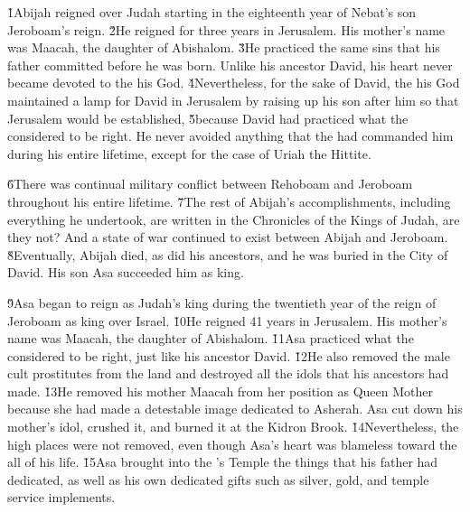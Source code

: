 \v{1}Abijah reigned over Judah starting in the eighteenth year of Nebat's son Jeroboam's reign. \v{2}He reigned for three years in Jerusalem. His mother's name was Maacah, the daughter of Abishalom. \v{3}He practiced the same sins that his father committed before he was born. Unlike his ancestor David, his heart never became devoted to the  his God. \v{4}Nevertheless, for the sake of David, the  his God maintained a lamp for David in Jerusalem by raising up his son after him so that Jerusalem would be established, \v{5}because David had practiced what the  considered to be right. He never avoided anything that the  had commanded him during his entire lifetime, except for the case of Uriah the Hittite.

\v{6}There was continual military conflict between Rehoboam and Jeroboam throughout his entire lifetime. \v{7}The rest of Abijah's accomplishments, including everything he undertook, are written in the Chronicles of the Kings of Judah, are they not? And a state of war continued to exist between Abijah and Jeroboam. \v{8}Eventually, Abijah died, as did his ancestors, and he was buried in the City of David. His son Asa succeeded him as king.

\v{9}Asa began to reign as Judah's king during the twentieth year of the reign of Jeroboam as king over Israel. \v{10}He reigned 41 years in Jerusalem. His mother's name was Maacah, the daughter of Abishalom. \v{11}Asa practiced what the  considered to be right, just like his ancestor David. \v{12}He also removed the male cult prostitutes from the land and destroyed all the idols that his ancestors had made. \v{13}He removed his mother Maacah from her position as Queen Mother because she had made a detestable image dedicated to Asherah. Asa cut down his mother's idol, crushed it, and burned it at the Kidron Brook. \v{14}Nevertheless, the high places were not removed, even though Asa's heart was blameless toward the  all of his life. \v{15}Asa brought into the 's Temple the things that his father had dedicated, as well as his own dedicated gifts such as silver, gold, and temple service implements.

